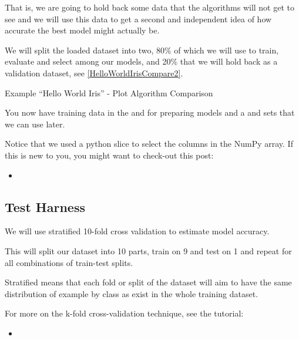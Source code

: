 That is, we are going to hold back some data that the algorithms will not get to see and we will use this data to get a second and independent idea of how accurate the best model might actually be.
    
We will split the loaded dataset into two, 80\% of which we will use to train, evaluate and select among our models, and 20\% that we will hold back as a validation dataset, see \ref{HelloWorldIrisCompare2}.
  

\begin{code}
        
    
    \caption{Example ``Hello World Iris'' - Plot Algorithm Comparison} \label{HelloWorldIrisCompare2}
\end{code}        

You now have training data in the  and  for preparing models and a  and  sets that we can use later.
    
Notice that we used a python slice to select the columns in the NumPy array. If this is new to you, you might want to check-out this post:


\begin{itemize}
  \item {}
\end{itemize}     

\subsection{Test Harness}

We will use stratified 10-fold cross validation to estimate model accuracy.
    
This will split our dataset into 10 parts, train on 9 and test on 1 and repeat for all combinations of train-test splits.
    
Stratified means that each fold or split of the dataset will aim to have the same distribution of example by class as exist in the whole training dataset.
    
For more on the k-fold cross-validation technique, see the tutorial:
    
\begin{itemize}
    \item {}
\end{itemize}     
    
